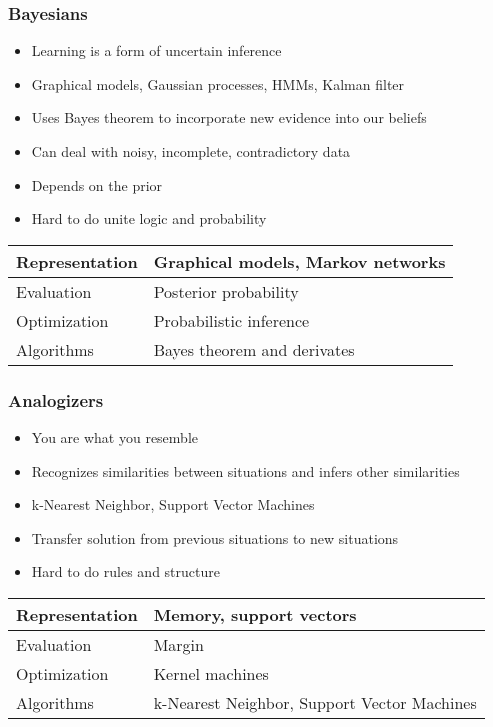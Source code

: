 \documentclass[UTF8,11pt,colorlinks,compress,openany]{beamer}%
\begin{document}
\begin{frame}\frametitle{Bayesians}
\begin{itemize}
	\item Learning is a form of uncertain inference
	\item Graphical models, Gaussian processes, HMMs, Kalman filter
	\item Uses Bayes theorem to incorporate new evidence into our beliefs
	\item Can deal with noisy, incomplete, contradictory data
	\item Depends on the prior
	\item Hard to do unite logic and probability
\end{itemize}
\begin{table}
\begin{tabu}{l|l}
\hline
Representation &Graphical models, Markov networks\\
\hline
Evaluation &Posterior probability\\
\hline
Optimization &Probabilistic inference\\
\hline
Algorithms &Bayes theorem and derivates\\
\hline
\end{tabu}
\end{table}
\end{frame}

\begin{frame}\frametitle{Analogizers}
\begin{itemize}
	\item You are what you resemble
	\item Recognizes similarities between situations and infers other similarities
	\item k-Nearest Neighbor, Support Vector Machines
	\item Transfer solution from previous situations to new situations
	\item Hard to do rules and structure
\end{itemize}
\begin{table}
\begin{tabu}{l|l}
\hline
Representation &Memory, support vectors\\
\hline
Evaluation &Margin\\
\hline
Optimization &Kernel machines\\
\hline
Algorithms &k-Nearest Neighbor, Support Vector Machines\\
\hline
\end{tabu}
\end{table}
\end{frame}
\end{document}
